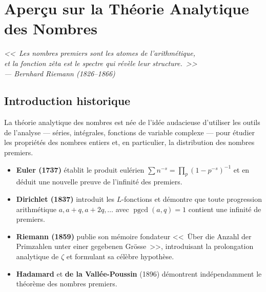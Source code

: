 \documentclass[12pt,a4paper,openany]{book}
\theoremstyle{definition}
\theoremstyle{plain}
\theoremstyle{remark}
\DeclareMathOperator{\pgcd}{pgcd}
\begin{document}

\chapter{Aperçu sur la Théorie Analytique des Nombres}
\label{chap:analytique}

\begin{center}
\itshape
<<~Les nombres premiers sont les atomes de l'arithmétique,\\
et la fonction zêta est le spectre qui révèle leur structure.~>>\\[4pt]
--- Bernhard Riemann (1826--1866)
\end{center}

\bigskip

\section{Introduction historique}
\label{sec:analytique-intro}

La théorie analytique des nombres est née de l'idée audacieuse d'utiliser les
outils de l'analyse --- séries, intégrales, fonctions de variable complexe ---
pour étudier les propriétés des nombres entiers et, en particulier, la distribution
des nombres premiers.

\begin{itemize}
  \item \textbf{Euler (1737)} établit le produit eulérien
    $\sum n^{-s} = \prod_p (1 - p^{-s})^{-1}$ et en déduit une nouvelle preuve
    de l'infinité des premiers.
  \item \textbf{Dirichlet (1837)}
    introduit les $L$-fonctions et démontre que toute progression arithmétique
    $a, a+q, a+2q, \ldots$ avec $\pgcd(a,q)=1$ contient une infinité de premiers.
  \item \textbf{Riemann (1859)} publie son mémoire
    fondateur <<~Über die Anzahl der Primzahlen unter einer gegebenen Grösse~>>,
    introduisant la prolongation analytique de $\zeta$ et formulant sa célèbre
    hypothèse.
  \item \textbf{Hadamard} et
    \textbf{de la Vallée-Poussin}
    (1896) démontrent indépendamment le théorème des nombres premiers.
\end{itemize}
\end{document}
